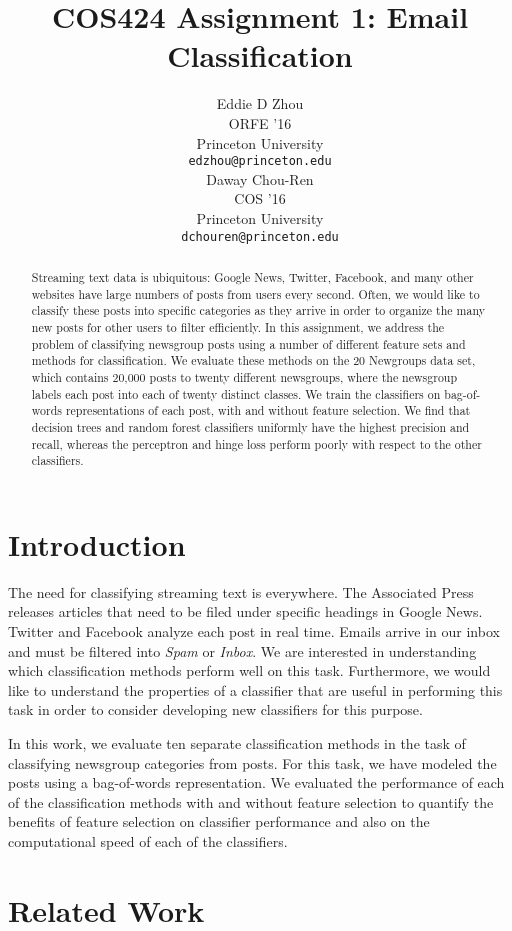 \documentclass{article} %
\title{COS424 Assignment 1: Email Classification}
\author{
Eddie D Zhou\\
ORFE '16\\
Princeton University\\
\texttt{edzhou@princeton.edu} \\
\And
Daway Chou-Ren\\
COS '16\\
Princeton University\\
\texttt{dchouren@princeton.edu} \\
}
\begin{document}
\maketitle

\begin{abstract}
Streaming text data is ubiquitous: Google News, Twitter, Facebook, and many other websites have large numbers of posts from users every second. Often, we would like to classify these posts into specific categories as they arrive in order to organize the many new posts for other users to filter efficiently. In this assignment, we address the problem of classifying newsgroup posts using a number of different feature sets and methods for classification. We evaluate these methods on the 20 Newgroups data set, which contains 20,000 posts to twenty different newsgroups, where the newsgroup labels each post into each of twenty distinct classes. We train the classifiers on bag-of-words representations of each post, with and without feature selection. We find that decision trees and random forest classifiers uniformly have the highest precision and recall, whereas the perceptron and hinge loss perform poorly with respect to the other classifiers.
\end{abstract}
\section{Introduction}

The need for classifying streaming text is everywhere. The Associated Press releases articles that need to be filed under specific headings in Google News. Twitter and Facebook analyze each post in real time. Emails arrive in our inbox and must be filtered into \emph{Spam} or \emph{Inbox}. We are interested in understanding which classification methods perform well on this task. Furthermore, we would like to understand the properties of a classifier that are useful in performing this task in order to consider developing new classifiers for this purpose.

In this work, we evaluate ten separate classification methods in the task of classifying newsgroup categories from posts. For this task, we have modeled the posts using a bag-of-words representation. We evaluated the performance of each of the classification methods with and without feature selection to quantify the benefits of feature selection on classifier performance and also on the computational speed of each of the classifiers.

\section{Related Work}
\end{document}
